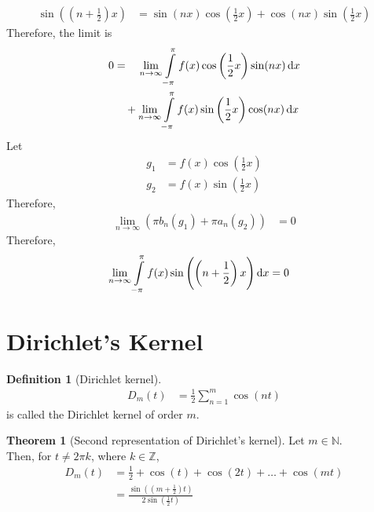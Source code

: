 \documentclass[fleqn, a4paper, 12pt, twoside]{article}
\theoremstyle{definition}
\newtheorem{definition}{Definition}
\theoremstyle{theorem}
\newtheorem{theorem}{Theorem}
\begin{document}
\begin{solution}
	\begin{align*}
		\sin\left( \left( n + \frac{1}{2} \right) x \right) &= \sin(n x) \cos\left( \frac{1}{2} x \right) + \cos(n x) \sin\left( \frac{1}{2} x \right)
	\end{align*}
	Therefore, the limit is
	\begin{align*}
		0 &= \quad \lim\limits_{n \to \infty} \int\limits_{-\pi}^{\pi} f(x) \cos\left( \frac{1}{2} x \right) \sin(n x) \dif x\\
		&\quad + \lim\limits_{n \to \infty} \int\limits_{-\pi}^{\pi} f(x) \sin\left( \frac{1}{2} x \right) \cos(n x) \dif x
	\end{align*}
	Let
	\begin{align*}
		g_1 &= f(x) \cos\left( \frac{1}{2} x \right)\\
		g_2 &= f(x) \sin\left( \frac{1}{2} x \right)
	\end{align*}
	Therefore,
	\begin{align*}
		\lim\limits_{n \to \infty} \left( \pi b_n(g_1) + \pi a_n(g_2) \right) &= 0
	\end{align*}
	Therefore,
	\begin{align*}
		\lim\limits_{n \to \infty} \int\limits_{-\pi}^{\pi} f(x) \sin\left( \left( n + \frac{1}{2} \right) x \right) \dif x &= 0
	\end{align*}
\end{solution}

\section{Dirichlet's Kernel}

\begin{definition}[Dirichlet kernel]
	\begin{align*}
		D_m(t) &= \frac{1}{2} \sum\limits_{n = 1}^{m} \cos(n t)
	\end{align*}
	is called the Dirichlet kernel of order $m$.
\end{definition}

\begin{theorem}[Second representation of Dirichlet's kernel]
	Let $m \in \mathbb{N}$.\\
	Then, for $t \neq 2 \pi k$, where $k \in \mathbb{Z}$,
	\begin{align*}
		D_m(t) &= \frac{1}{2} + \cos(t) + \cos(2 t) + \dots + \cos(m t)\\
		&= \frac{\sin\left( \left( m + \frac{1}{2} \right) t \right)}{2 \sin\left( \frac{1}{2} t \right)}
	\end{align*}
\end{theorem}
\end{document}
